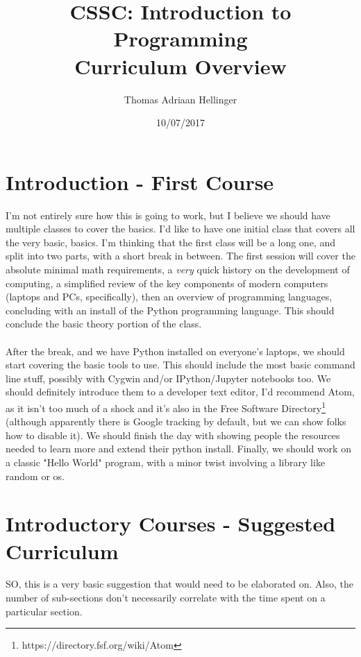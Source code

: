 \documentclass[11pt]{article}
\title{%
	\textbf{CSSC: Introduction to Programming \\
	\large Curriculum Overview}}
\author{Thomas Adriaan Hellinger}
\date{10/07/2017}
\begin{document}
\maketitle

\section*{Introduction - First Course}

I'm not entirely sure how this is going to work, but I believe we should have multiple classes to cover the basics. I'd like to have one initial class that covers all the very basic, basics. I'm thinking that the first class will be a long one, and split into two parts, with a short break in between. The first session will cover the absolute minimal math requirements, a \emph{very} quick history on the development of computing, a simplified review of the key components of modern computers (laptops and PCs, specifically), then an overview of programming languages, concluding with an install of the Python programming language. This should conclude the basic theory portion of the class.
\\
\\
After the break, and we have Python installed on everyone's laptops, we should start covering the basic tools to use. This should include the most basic command line stuff, possibly with Cygwin and/or IPython/Jupyter notebooks too. We should definitely introduce them to a developer text editor, I'd recommend Atom, as it isn't too much of a shock and it's also in the Free Software Directory\footnote{https://directory.fsf.org/wiki/Atom} (although apparently there is Google tracking by default, but we can show folks how to disable it). We should finish the day with showing people the resources needed to learn more and extend their python install. Finally, we should work on a classic "Hello World" program, with a minor twist involving a library like random or os.
\newpage
\section*{Introductory Courses - Suggested Curriculum}

SO, this is a very basic suggestion that would need to be elaborated on. Also, the number of sub-sections don't necessarily correlate with the time spent on a particular section.
\end{document}
